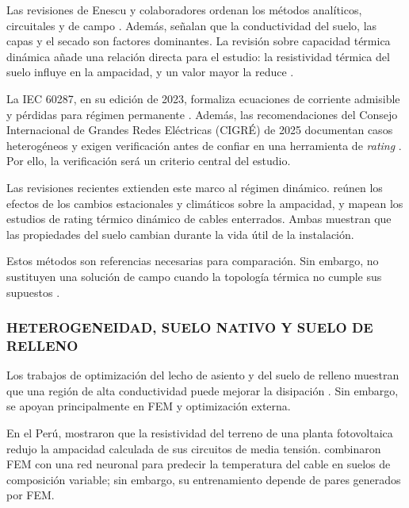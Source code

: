 Las revisiones de Enescu y colaboradores ordenan los métodos analíticos, circuitales y de campo \parencite[4,11,17]{enescu2020}. Además, señalan que la conductividad del suelo, las capas y el secado son factores dominantes. La revisión sobre capacidad térmica dinámica añade una relación directa para el estudio: la resistividad térmica del suelo influye en la ampacidad, y un valor mayor la reduce \parencite[3--6]{enescu2021}.

La IEC 60287, en su edición de 2023, formaliza ecuaciones de corriente admisible y pérdidas para régimen permanente \parencite[cláusulas 4--5]{iec60287}. Además, las recomendaciones del Consejo Internacional de Grandes Redes Eléctricas (CIGRÉ) de 2025 documentan casos heterogéneos y exigen verificación antes de confiar en una herramienta de \textit{rating} \parencite[3--4,41--42,93--99]{cigre2025}. Por ello, la verificación será un criterio central del estudio.

Las revisiones recientes extienden este marco al régimen dinámico. \textcite{mobius2025} reúnen los efectos de los cambios estacionales y climáticos sobre la ampacidad, y \textcite{fariz2026} mapean los estudios de rating térmico dinámico de cables enterrados. Ambas muestran que las propiedades del suelo cambian durante la vida útil de la instalación.

Estos métodos son referencias necesarias para comparación. Sin embargo, no sustituyen una solución de campo cuando la topología térmica no cumple sus supuestos \parencites{iec60287}{iec60853}[3--4,93--99]{cigre2025}.

\subsubsection{HETEROGENEIDAD, SUELO NATIVO Y SUELO DE RELLENO}

Los trabajos de optimización del lecho de asiento y del suelo de relleno muestran que una región de alta conductividad puede mejorar la disipación \parencites[1--3]{oclon2015}[1--4]{atoccsa2024}. Sin embargo, se apoyan principalmente en FEM y optimización externa.

En el Perú, \textcite[7--8]{ariasVelasquez2023} mostraron que la resistividad del terreno de una planta fotovoltaica redujo la ampacidad calculada de sus circuitos de media tensión. \textcite[1--3,12]{aldulaimi2024} combinaron FEM con una red neuronal para predecir la temperatura del cable en suelos de composición variable; sin embargo, su entrenamiento depende de pares generados por FEM.

